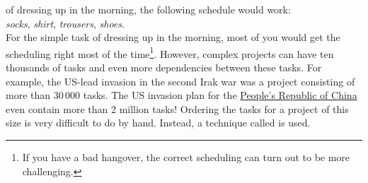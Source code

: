 of dressing up in the morning, the following schedule would work:
\\[0.2cm]
\hspace*{1.3cm}
\textsl{socks}, \textsl{shirt}, \textsl{trousers}, \textsl{shoes}.
\\[0.2cm]
For the simple task of dressing up in the morning, most of you would get the scheduling right most of the
time\footnote{If you have a bad hangover, the correct scheduling can turn out to be more challenging.}.
However, complex projects can have ten thousands of tasks and even more dependencies between these tasks.  For
example, the US-lead invasion in the second Irak war was a project consisting of more than $30\,000$ tasks.
The US invasion plan for the \href{https://en.wikipedia.org/wiki/China}{People's Republic of China} even
contain more than 2 million tasks!  Ordering the tasks for a project of this size is very difficult to do by
hand.  Instead, a technique called  is used. 

